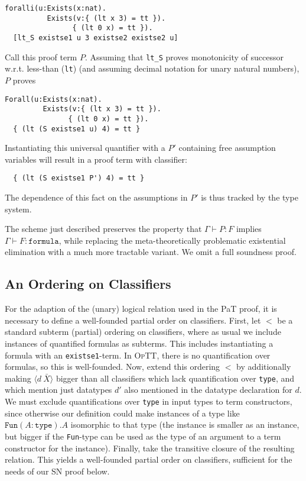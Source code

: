 \documentclass{fundam}
\newcommand{\seq}[3]{#1 \vdash #2 : #3}
\newcommand{\optt}{\textsc{OpTT}}
\begin{document}
\begin{verbatim}
foralli(u:Exists(x:nat). 
          Exists(v:{ (lt x 3) = tt }).
                { (lt 0 x) = tt }).
  [lt_S existse1 u 3 existse2 existse2 u]
\end{verbatim}

\noindent Call this proof term $P$.  Assuming that \texttt{lt\_S} proves
monotonicity of successor w.r.t. less-than (\texttt{lt}) (and assuming
decimal notation for unary natural numbers), $P$ proves

\begin{verbatim}
Forall(u:Exists(x:nat). 
         Exists(v:{ (lt x 3) = tt }).
               { (lt 0 x) = tt }).
  { (lt (S existse1 u) 4) = tt }
\end{verbatim}

\noindent Instantiating this universal quantifier with a $P'$
containing free assumption variables will result in a proof
term with classifier:

\begin{verbatim}
  { (lt (S existse1 P') 4) = tt }
\end{verbatim}

\noindent The dependence of this fact on the assumptions in $P'$
is thus tracked by the type system.  

The scheme just described preserves the property that
$\seq{\Gamma}{P}{F}$ implies $\seq{\Gamma}{F}{\texttt{formula}}$,
while replacing the meta-theoretically problematic existential
elimination with a much more tractable variant.  We omit a full
soundness proof.

\subsection{An Ordering on Classifiers}

For the adaption of the (unary) logical relation used in the PaT
proof, it is necessary to define a well-founded partial order on
classifiers.  First, let $<$ be a standard subterm (partial) ordering
on classifiers, where as usual we include instances of quantified
formulas as subterms.  This includes instantiating a formula with an
\texttt{existse1}-term.  In \optt, there is no quantification over
formulas, so this is well-founded.  Now, extend this ordering $<$ by
additionally making $\langle d\ \bar{X}\rangle$ bigger than all
classifiers which lack quantification over \texttt{type}, and which
mention just datatypes $d'$ also mentioned in the datatype declaration
for $d$.  We must exclude quantifications over \texttt{type} in input
types to term constructors, since otherwise our definition could make
instances of a type like $\texttt{Fun}(A:\texttt{type}).A$ isomorphic
to that type (the instance is smaller as an instance, but bigger if
the \texttt{Fun}-type can be used as the type of an argument to a term
constructor for the instance).  Finally, take the transitive closure
of the resulting relation.  This yields a well-founded partial order
on classifiers, sufficient for the needs of our SN proof below.
\end{document}
